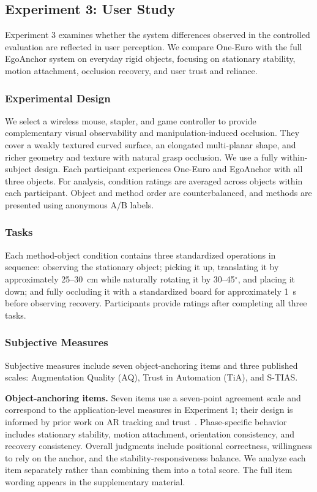 \documentclass[review]{vgtc}
\begin{document}
\subsection{Experiment 3: User Study}\label{sec:exp3-design}

Experiment 3 examines whether the system differences observed in the controlled evaluation are reflected in user perception. We compare One-Euro with the full EgoAnchor system on everyday rigid objects, focusing on stationary stability, motion attachment, occlusion recovery, and user trust and reliance.

\subsubsection{Experimental Design}

We select a wireless mouse, stapler, and game controller to provide complementary visual observability and manipulation-induced occlusion. They cover a weakly textured curved surface, an elongated multi-planar shape, and richer geometry and texture with natural grasp occlusion. We use a fully within-subject design. Each participant experiences One-Euro and EgoAnchor with all three objects. For analysis, condition ratings are averaged across objects within each participant. Object and method order are counterbalanced, and methods are presented using anonymous A/B labels.

\subsubsection{Tasks}

Each method-object condition contains three standardized operations in sequence: observing the stationary object; picking it up, translating it by approximately 25--30~cm while naturally rotating it by 30--45$^\circ$, and placing it down; and fully occluding it with a standardized board for approximately 1~s before observing recovery. Participants provide ratings after completing all three tasks.

\subsubsection{Subjective Measures}

Subjective measures include seven object-anchoring items and three published scales: Augmentation Quality (AQ), Trust in Automation (TiA), and S-TIAS.

\textbf{Object-anchoring items.}
Seven items use a seven-point agreement scale and correspond to the application-level measures in Experiment 1; their design is informed by prior work on AR tracking and trust~\cite{trustar2024}. Phase-specific behavior includes stationary stability, motion attachment, orientation consistency, and recovery consistency. Overall judgments include positional correctness, willingness to rely on the anchor, and the stability-responsiveness balance. We analyze each item separately rather than combining them into a total score. The full item wording appears in the supplementary material.
\end{document}
